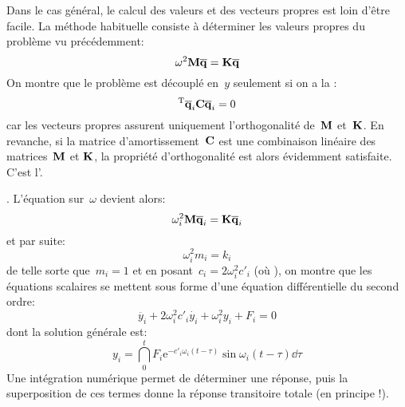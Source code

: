 Dans le cas général, le calcul des valeurs et des vecteurs propres  est loin d'être facile. La méthode habituelle consiste à déterminer les valeurs propres  du problème vu précédemment:
\begin{equation} \omega^2\MM{M}\VV{\overline{q}}=\MM{K}\VV{\overline{q}} \end{equation}
On montre que le problème est découplé en~$y$ seulement si on a la : \begin{equation}\LL{\overline{q}}_i\MM{C}\VV{\overline{q}}_i=0\end{equation}
\medskipvm
{} car les vecteurs propres assurent uniquement l'orthogonalité de~$\MM{M}$ et~$\MM{K}$.
\medskipvm
En revanche, si la matrice d'amortissement~$\MM{C}$ est une combinaison linéaire des matrices~$\MM{M}$ et $\MM{K}$, la propriété d'orthogonalité est alors évidemment satisfaite. C'est l'.

.
L'équation sur~$\omega$ devient alors:
\begin{equation} \omega_i^2\MM{M}\VV{\overline{q}}_i =\MM{K}\VV{\overline{q}}_i \end{equation}
et par suite:
\begin{equation} \omega_i^2m_i = k_i\end{equation}
\medskipvm
{} de telle sorte que~$m_i=1$ et en posant~$c_i = 2\omega_i^2c'_i$ (où ), on montre que les équations scalaires se mettent sous forme d'une équation différentielle du second ordre:
\begin{equation} \ddot{y_i}+2\omega_i^2c'_i \dot{y_i} + \omega_i^2y_i + F_i = 0 \end{equation}
dont la solution générale est:
\begin{equation} y_i = \dint_0^t F_i \mathrm{e}^{-c'_i\omega_i(t-\tau)}\sin \omega_i (t-\tau) \dd\tau \end{equation}
\medskipvm
Une intégration numérique permet de déterminer une réponse, puis la superposition de ces termes donne la réponse transitoire totale (en principe !).
\medskipvm
{}

